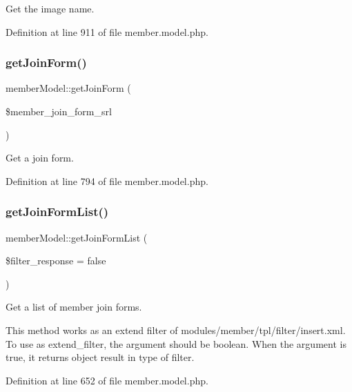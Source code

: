 Get the image name. 



Definition at line 911 of file member.\+model.\+php.

\hypertarget{classmemberModel_ad4ecb6428f8ccea4369bb7535464570e}{}\label{classmemberModel_ad4ecb6428f8ccea4369bb7535464570e} 
\subsubsection{\texorpdfstring{get\+Join\+Form()}{getJoinForm()}}
{\footnotesize\ttfamily member\+Model\+::get\+Join\+Form (\begin{DoxyParamCaption}\item[{}]{\$member\+\_\+join\+\_\+form\+\_\+srl }\end{DoxyParamCaption})}



Get a join form. 



Definition at line 794 of file member.\+model.\+php.

\hypertarget{classmemberModel_af8d32c782e4637661e9379acb8ee96b1}{}\label{classmemberModel_af8d32c782e4637661e9379acb8ee96b1} 
\subsubsection{\texorpdfstring{get\+Join\+Form\+List()}{getJoinFormList()}}
{\footnotesize\ttfamily member\+Model\+::get\+Join\+Form\+List (\begin{DoxyParamCaption}\item[{}]{\$filter\+\_\+response = {\ttfamily false} }\end{DoxyParamCaption})}



Get a list of member join forms. 

This method works as an extend filter of modules/member/tpl/filter/insert.\+xml. To use as extend\+\_\+filter, the argument should be boolean. When the argument is true, it returns object result in type of filter. 

Definition at line 652 of file member.\+model.\+php.

\hypertarget{classmemberModel_a80179b6ef63e1917514c098df24c6e93}{}\label{classmemberModel_a80179b6ef63e1917514c098df24c6e93} 
